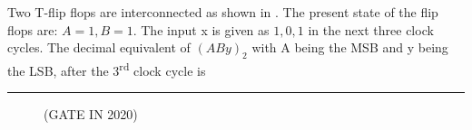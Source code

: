  Two T-flip flops are interconnected as shown in . The present state of the flip flops are: $A = 1, B = 1$. The input x is given as $1, 0, 1$ in the next three clock cycles. The decimal equivalent of $(ABy)_{2}$ with A being the MSB and y being the LSB, after the 3\textsuperscript{rd} clock cycle is \rule{12mm}{0.4pt}

		\vspace{1cm}
	\begin{figure}[ht]
		\centering
		
		\caption{}
		\label{fig:tff1}
		\hfill (GATE IN 2020)
	\end{figure}
